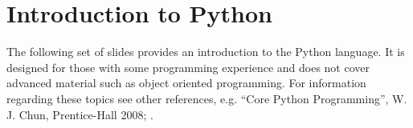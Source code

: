 \documentclass[letterpaper,10pt,english,openany]{sphinxmanual}
\begin{document}
\chapter{Introduction to Python}
\label{\detokenize{introduction_to_python/index:introduction-to-python}}\label{\detokenize{introduction_to_python/index:id1}}\label{\detokenize{introduction_to_python/index::doc}}
The following set of slides provides an introduction to the Python language.
It is designed for those with some programming experience and does not cover
advanced material such as object oriented programming. For information regarding
these topics see other references, e.g. “Core Python Programming”, W. J. Chun,
Prentice-Hall 2008; .

\end{document}
